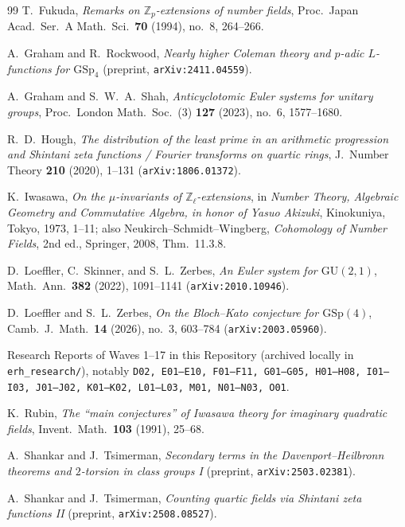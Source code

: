 \begin{thebibliography}{99}
T.~Fukuda,
\emph{Remarks on $\mathbb{Z}_p$-extensions of number fields},
Proc.\ Japan Acad.\ Ser.\ A Math.\ Sci.\ \textbf{70} (1994), no.~8, 264--266.

A.~Graham and R.~Rockwood,
\emph{Nearly higher Coleman theory and $p$-adic $L$-functions for $\mathrm{GSp}_4$} (preprint, \texttt{arXiv:2411.04559}).

A.~Graham and S.~W.~A.~Shah,
\emph{Anticyclotomic Euler systems for unitary groups},
Proc.\ London Math.\ Soc.\ (3) \textbf{127} (2023), no.~6, 1577--1680.

R.~D.~Hough,
\emph{The distribution of the least prime in an arithmetic progression and Shintani zeta functions / Fourier transforms on quartic rings},
J.\ Number Theory \textbf{210} (2020), 1--131 (\texttt{arXiv:1806.01372}).

K.~Iwasawa,
\emph{On the $\mu$-invariants of $\mathbb{Z}_\ell$-extensions},
in \emph{Number Theory, Algebraic Geometry and Commutative Algebra, in honor of Yasuo Akizuki}, Kinokuniya, Tokyo, 1973, 1--11; also Neukirch--Schmidt--Wingberg, \emph{Cohomology of Number Fields}, 2nd ed., Springer, 2008, Thm.~11.3.8.

D.~Loeffler, C.~Skinner, and S.~L.~Zerbes,
\emph{An Euler system for $\mathrm{GU}(2,1)$},
Math.\ Ann.\ \textbf{382} (2022), 1091--1141 (\texttt{arXiv:2010.10946}).

D.~Loeffler and S.~L.~Zerbes,
\emph{On the Bloch--Kato conjecture for $\mathrm{GSp}(4)$},
Camb.\ J.\ Math.\ \textbf{14} (2026), no.~3, 603--784 (\texttt{arXiv:2003.05960}).

Research Reports of Waves 1--17 in this Repository (archived locally in \texttt{erh\_research/}), notably \texttt{D02, E01--E10, F01--F11, G01--G05, H01--H08, I01--I03, J01--J02, K01--K02, L01--L03, M01, N01--N03, O01}.

K.~Rubin,
\emph{The ``main conjectures'' of Iwasawa theory for imaginary quadratic fields},
Invent.\ Math.\ \textbf{103} (1991), 25--68.

A.~Shankar and J.~Tsimerman,
\emph{Secondary terms in the Davenport--Heilbronn theorems and $2$-torsion in class groups I} (preprint, \texttt{arXiv:2503.02381}).

A.~Shankar and J.~Tsimerman,
\emph{Counting quartic fields via Shintani zeta functions II} (preprint, \texttt{arXiv:2508.08527}).


\end{thebibliography}
